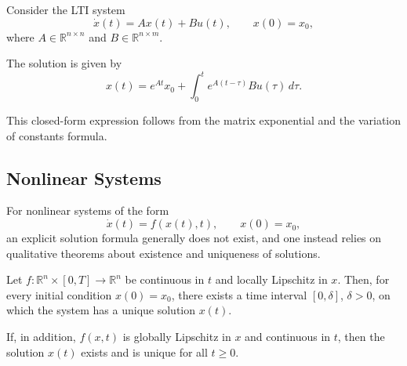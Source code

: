 Consider the LTI system
\[
    \dot{x}(t) = A x(t) + B u(t), \qquad x(0) = x_0,
\]
where $A \in \mathbb{R}^{n \times n}$ and $B \in \mathbb{R}^{n \times m}$.

The solution is given by
\[
    x(t) = e^{At} x_0 + \int_0^t e^{A(t-\tau)} B u(\tau)\, d\tau.
\]

This closed-form expression follows from the matrix exponential and the variation of constants formula.


\subsection{Nonlinear Systems}

For nonlinear systems of the form
\[
    \dot{x}(t) = f(x(t),t), \qquad x(0) = x_0,
\]
an explicit solution formula generally does not exist, and one instead relies on qualitative theorems about existence and uniqueness of solutions.


\begin{theorem}
    Let $f:\mathbb{R}^n \times [0,T] \to \mathbb{R}^n$ be continuous in $t$ and locally Lipschitz in $x$.  
    Then, for every initial condition $x(0)=x_0$, there exists a time interval $[0,\delta]$, $\delta > 0$, on which the system has a unique solution $x(t)$.
\end{theorem}


\begin{theorem}
    If, in addition, $f(x,t)$ is globally Lipschitz in $x$ and continuous in $t$, then the solution $x(t)$ exists and is unique for all $t \geq 0$.
\end{theorem}
